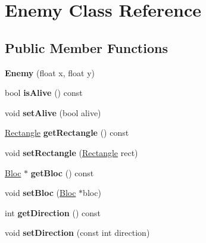 \hypertarget{class_enemy}{}\section{Enemy Class Reference}
\label{class_enemy}
\subsection*{Public Member Functions}
\begin{DoxyCompactItemize}
\item 
\mbox{\label{class_enemy_a0e3ad09de3d7cc19e5f01dd4d9424ee8}} 
{\bfseries Enemy} (float x, float y)
\item 
\mbox{\label{class_enemy_a2801f42818600b19a7381dd2d1635af8}} 
bool {\bfseries is\+Alive} () const
\item 
\mbox{\label{class_enemy_a1df1547f3501c8374a7f6c682e7424bd}} 
void {\bfseries set\+Alive} (bool alive)
\item 
\mbox{\label{class_enemy_af8546dc3a6793da0d1f218683e6a71e5}} 
\hyperlink{class_rectangle}{Rectangle} {\bfseries get\+Rectangle} () const
\item 
\mbox{\label{class_enemy_a593c78dbe6538654ae279aef8f217ef5}} 
void {\bfseries set\+Rectangle} (\hyperlink{class_rectangle}{Rectangle} rect)
\item 
\mbox{\label{class_enemy_afdb12cd473f29f51692ac7697b06543b}} 
\hyperlink{class_bloc}{Bloc} $\ast$ {\bfseries get\+Bloc} () const
\item 
\mbox{\label{class_enemy_a14052c7f2c96df86c8945abeb2a7e18c}} 
void {\bfseries set\+Bloc} (\hyperlink{class_bloc}{Bloc} $\ast$bloc)
\item 
\mbox{\label{class_enemy_a7669f9dc829ed3fbe7caea8a74188cfa}} 
int {\bfseries get\+Direction} () const
\item 
\mbox{\label{class_enemy_ac85eaf691ac651bf87d73b8fee246efd}} 
void {\bfseries set\+Direction} (const int direction)
\item 
\mbox{\label{class_enemy_a65063f315d4890cd3dd3b796b95e28c7}} 

\end{DoxyCompactItemize}
